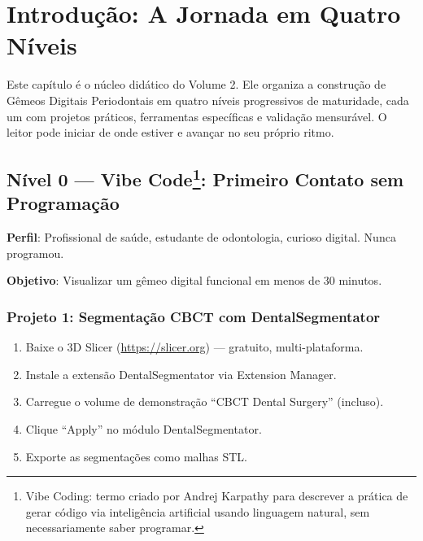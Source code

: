 
\section{Introdução: A Jornada em Quatro Níveis}

Este capítulo é o núcleo didático do Volume 2. Ele organiza a construção de Gêmeos Digitais Periodontais em quatro níveis progressivos de maturidade, cada um com projetos práticos, ferramentas específicas e validação mensurável. O leitor pode iniciar de onde estiver e avançar no seu próprio ritmo.

\subsection{Nível 0 — Vibe Code\protect\footnote{Vibe Coding: termo criado por Andrej Karpathy para descrever a prática de gerar código via inteligência artificial usando linguagem natural, sem necessariamente saber programar.}: Primeiro Contato sem Programação}

\textbf{Perfil}: Profissional de saúde, estudante de odontologia, curioso digital. Nunca programou.

\textbf{Objetivo}: Visualizar um gêmeo digital funcional em menos de 30 minutos.

\subsubsection*{Projeto 1: Segmentação CBCT com DentalSegmentator}

\begin{enumerate}
    \item Baixe o 3D Slicer (\url{https://slicer.org}) --- gratuito, multi-plataforma.
    \item Instale a extensão DentalSegmentator via Extension Manager.
    \item Carregue o volume de demonstração ``CBCT Dental Surgery'' (incluso).
    \item Clique ``Apply'' no módulo DentalSegmentator.
    \item Exporte as segmentações como malhas STL.
\end{enumerate}

